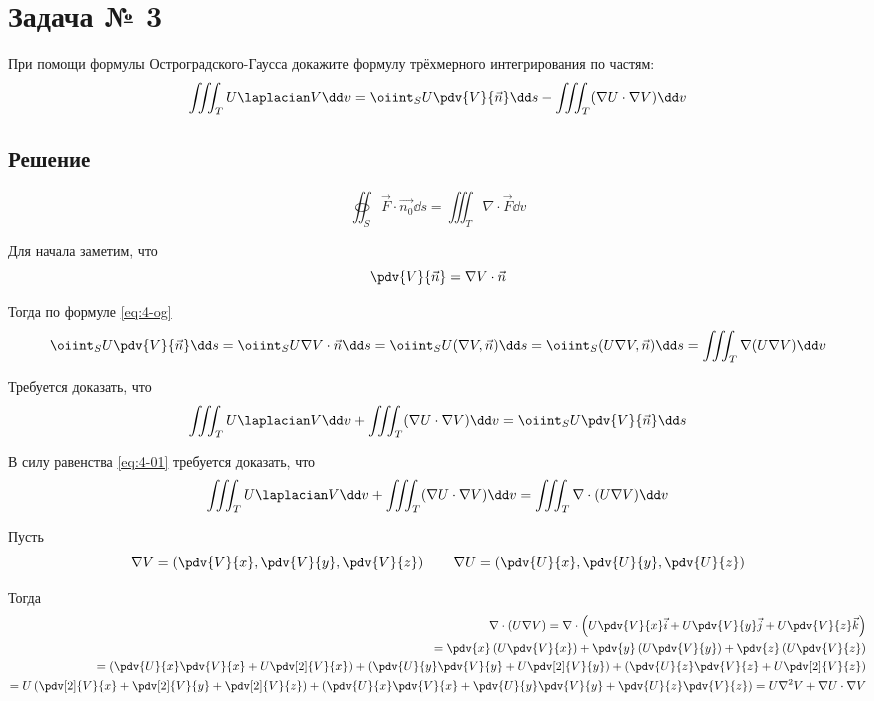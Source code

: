 \section{Задача № 3}

При помощи формулы Остроградского-Гаусса докажите формулу трёхмерного
интегрирования по частям:
\[
  \iiint_{T} U \laplacian V \dd v
  = \oiint_{S} U \pdv{V}{\vec{n}} \dd s
  - \iiint_{T} (\nabla U \cdot \nabla V) \dd v
\]

\subsection{Решение}

\begin{equation}\label{eq:4-og}
  \tag{Формула Гаусса-Остроградского}
  \oiint_{S} \vec{F} \cdot \vec{n_0} \dd s
  = \iiint_{T} \nabla \cdot \vec{F} \dd v
\end{equation}

Для начала заметим, что
\[
  \pdv{V}{\vec{n}} = \nabla V \cdot \vec{n}
\]

Тогда по формуле \ref{eq:4-og}
\begin{equation}\label{eq:4-01}
  \oiint_{S} U \pdv{V}{\vec{n}} \dd s
  = \oiint_{S} U \nabla V \cdot \vec{n} \dd s
  = \oiint_{S} U (\nabla V, \vec{n}) \dd s
  = \oiint_{S} (U \nabla V, \vec{n}) \dd s
  = \iiint_{T} \nabla (U \nabla V) \dd v
\end{equation}

Требуется доказать, что
\[
  \iiint_{T} U \laplacian V \dd v
  + \iiint_{T} (\nabla U \cdot \nabla V) \dd v
  = \oiint_{S} U \pdv{V}{\vec{n}} \dd s
\]

В силу равенства \ref{eq:4-01} требуется доказать, что
\[
  \iiint_{T} U \laplacian V \dd v
  + \iiint_{T} (\nabla U \cdot \nabla V) \dd v
  = \iiint_{T} \nabla \cdot (U \nabla V) \dd v
\]

Пусть
\[
  \nabla V
  = \left(\pdv{V}{x}, \pdv{V}{y}, \pdv{V}{z}\right) \qquad
  \nabla U
  = \left(\pdv{U}{x}, \pdv{U}{y}, \pdv{U}{z}\right)
\]

Тогда
\[
\begin{split}
  \nabla \cdot (U \nabla V)
  = \nabla \cdot \left(U \pdv{V}{x} \vec{i} + U \pdv{V}{y} \vec{j} + U \pdv{V}{z} \vec{k}\right) \\
  = \pdv{x} \left(U \pdv{V}{x}\right)
  + \pdv{y} \left(U \pdv{V}{y}\right)
  + \pdv{z} \left(U \pdv{V}{z}\right) \\
  = \left(\pdv{U}{x} \pdv{V}{x} + U \pdv[2]{V}{x}\right)
  + \left(\pdv{U}{y} \pdv{V}{y} + U \pdv[2]{V}{y}\right)
  + \left(\pdv{U}{z} \pdv{V}{z} + U \pdv[2]{V}{z}\right) \\
  = U\left(\pdv[2]{V}{x} + \pdv[2]{V}{y} + \pdv[2]{V}{z}\right)
  + \left(\pdv{U}{x} \pdv{V}{x} + \pdv{U}{y} \pdv{V}{y} + \pdv{U}{z} \pdv{V}{z}\right)
  = U \nabla^2 V + \nabla U \cdot \nabla V
\end{split}
\]

